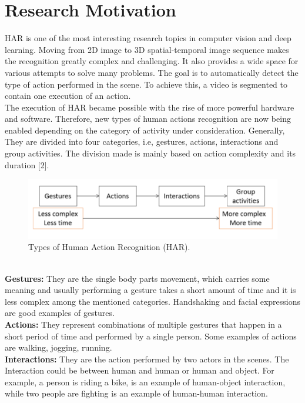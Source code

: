 \section{Research Motivation}
\hspace{5mm} HAR is one of the most interesting research topics in computer vision and deep learning. Moving from 2D image to 3D spatial-temporal image sequence makes the recognition greatly complex and challenging. It also provides a wide space for various attempts to solve many problems. The goal is to automatically detect the type of action performed in the scene. To achieve this, a video is segmented to contain one execution of an action.\\

The execution of HAR became possible with the rise of more powerful hardware and software. Therefore, new types of human actions recognition are now being enabled depending on the category of activity under consideration. Generally, They are divided into four categories, i.e, gestures, actions, interactions and group activities. The division made is mainly based on action complexity and its duration [2]. 
\begin{figure}[th]
\centering
\includegraphics{Figures/mh.PNG}
\decoRule
\caption[Types of Human Action Recognition "HAR"]{Types of Human Action Recognition (HAR).}
\label{fig:la}
\end{figure}\\

\textbf{Gestures:} They are the single body parts movement, which carries some meaning and usually performing a gesture takes a short amount of time and it is less complex among the mentioned categories. Handshaking and facial expressions are good examples of gestures.\\

\textbf{Actions:} They represent combinations of multiple gestures that happen in a short period of time and performed by a single person. Some examples of actions are walking, jogging, running.\\

\textbf{Interactions:} They are the action performed by two actors in the scenes. The Interaction could be between human and human or human and object. For example, a person is riding a bike, is an example of human-object interaction, while two people are fighting is an example of human-human interaction.\\

